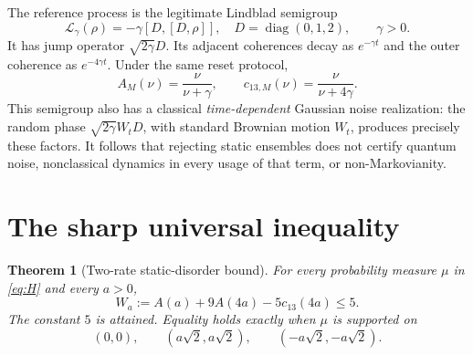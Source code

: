 \documentclass[11pt,a4paper]{article}
\newtheorem{theorem}{Theorem}
\newcommand{\diag}{\operatorname{diag}}
\begin{document}
The reference process is the legitimate Lindblad semigroup
\begin{equation}\label{eq:ref}
 \mathcal L_\gamma(\rho)=-\gamma[D,[D,\rho]],\quad
 D=\diag(0,1,2),\qquad\gamma>0.
\end{equation}
It has jump operator $\sqrt{2\gamma}D$. Its adjacent coherences decay
as $e^{-\gamma t}$ and the outer coherence as $e^{-4\gamma t}$.
Under the same reset protocol,
\begin{equation}\label{eq:refdata}
 A_M(\nu)=\frac\nu{\nu+\gamma},\qquad
 c_{13,M}(\nu)=\frac\nu{\nu+4\gamma}.
\end{equation}
This semigroup also has a classical \emph{time-dependent} Gaussian
noise realization: the random phase $\sqrt{2\gamma}W_tD$, with
standard Brownian motion $W_t$, produces precisely these factors.
It follows that rejecting static ensembles does not certify quantum
noise, nonclassical dynamics in every usage of that term, or
non-Markovianity.

\section{The sharp universal inequality}
\begin{theorem}[Two-rate static-disorder bound]\label{thm:witness}
For every probability measure $\mu$ in \eqref{eq:H} and every $a>0$,
\begin{equation}\label{eq:witness}
 W_a:=A(a)+9A(4a)-5c_{13}(4a)\leq5.
\end{equation}
The constant $5$ is attained. Equality holds exactly when $\mu$ is
supported on
\begin{equation}\label{eq:equality}
 (0,0),\qquad(a\sqrt2,a\sqrt2),\qquad(-a\sqrt2,-a\sqrt2).
\end{equation}
\end{theorem}
\end{document}
